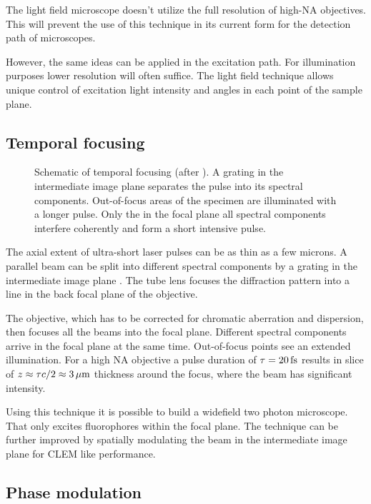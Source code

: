The light field microscope doesn't utilize the full resolution of
high-NA objectives. This will prevent the use of this technique in its
current form for the detection path of microscopes.

However, the same ideas can be applied in the excitation path. For
illumination purposes lower resolution will often suffice. The light
field technique allows unique control of excitation light intensity
and angles in each point of the sample plane.

\subsection{Temporal focusing}
\begin{figure}[!hbt]
  \centering
  
  \caption{Schematic of temporal focusing (after \citep{Oron2005}). A
    grating in the intermediate image plane separates the pulse into
    its spectral components. Out-of-focus areas of the specimen are
    illuminated with a longer pulse. Only the in the focal plane all
    spectral components interfere coherently and form a short
    intensive pulse.}
  \label{fig:oron}
\end{figure}
The axial extent of ultra-short laser pulses can be as thin as a few
microns. A parallel beam can be split into different spectral
components by a grating in the intermediate image plane
\citep{Oron2005}. The tube lens focuses the diffraction pattern into a
line in the back focal plane of the objective.

The objective, which has to be corrected for chromatic aberration and
dispersion, then focuses all the beams into the focal plane. Different
spectral components arrive in the focal plane at the same
time. Out-of-focus points see an extended illumination. For a high NA
objective a pulse duration of $\tau=\unit[20]{fs}$ results in slice of
$z\approx\tau c/2\approx\unit[3]{\mu m}$ thickness around the focus,
where the beam has significant intensity.

Using this technique it is possible to build a widefield two photon
microscope. That only excites fluorophores within the focal plane. The
technique can be further improved by spatially modulating the beam
in the intermediate image plane for CLEM like performance.

\subsection{Phase modulation}
